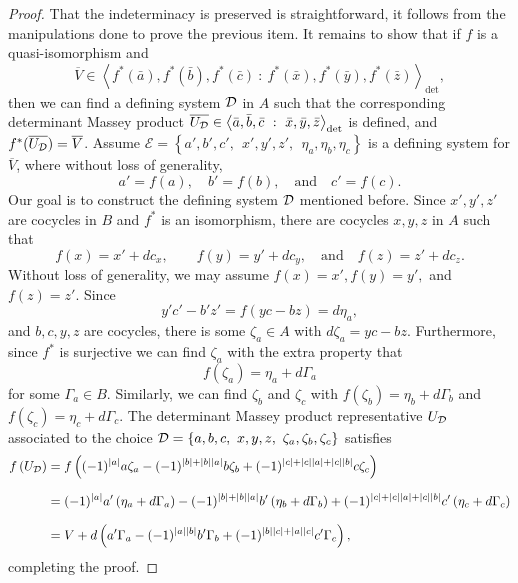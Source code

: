 \documentclass[11pt]{article}
\theoremstyle{definition}
\theoremstyle{definition}
\begin{document}
\begin{proof}
That the indeterminacy is preserved is straightforward, it follows from the manipulations done to prove the 
previous item.
It remains to show that if $f$ is a quasi-isomorphism and 
\begin{equation*}
\overline{V}\in \left\langle f^*(\bar a),f^*(\bar b),f^*(\bar c) \ : \ f^*(\bar x),f^*(\bar y), f^*(\bar z)\right\rangle_{\det},
\end{equation*}
then we can find a defining system $\mathcal D$ in $A$ such that the corresponding determinant
Massey product $\overline{U_\mathcal D} \in \left\langle \bar a, \bar b,\bar c \ : \ \bar x,\bar y, \bar z\right\rangle_{\det}$
is defined, and $f^*(\overline{U_\mathcal D}) = \overline{V}$.
Assume $\mathcal E = \left\{a',b',c', \ \ x',y',z', \ \ \eta_a,\eta_b,\eta_c\right\}$ is a defining system for $\overline{V}$,
where without loss of generality, 
\begin{equation*}
a' = f(a), \quad b'=f(b),\quad  \textrm{and}\quad c'=f(c).
\end{equation*}
Our goal is to construct the defining system $\mathcal D$ mentioned before.
Since $x',y',z'$ are cocycles in $B$ and $f^*$ is an isomorphism, there are cocycles $x,y,z$ in $A$ such that 
\begin{equation*}
f(x) = x' +dc_x,\qquad f(y) = y'+dc_y,\quad \textrm{and} \quad f(z)=z'+dc_z.
\end{equation*}
Without loss of generality, we may assume $f(x)=x', f(y)=y',$ and $f(z)=z'$.
Since 
\begin{equation*}
y'c'-b'z' = f\left(yc-bz\right) = d\eta_a,
\end{equation*}
and $b,c,y,z$ are cocycles, there is some $\zeta_a\in A$ with $d\zeta_a = yc-bz$.
Furthermore, since $f^*$ is surjective we can find $\zeta_a$ with the extra property that
\begin{equation*}
f\left(\zeta_a\right) = \eta_a + d\Gamma_a
\end{equation*}
for some $\Gamma_a\in B$.
Similarly, we can find $\zeta_b$ and $\zeta_c$ with $f\left(\zeta_b\right) = \eta_b + d\Gamma_b$ and 
$f\left(\zeta_c\right) = \eta_c + d\Gamma_c$.
The determinant Massey product representative $U_\mathcal D$
associated to the choice $\mD = \left\{a,b,c,\ x,y,z,\ \zeta_a,\zeta_b,\zeta_c \right\}$
satisfies
\begin{align*}
f\left(U_\mathcal D\right) 
& = f\left((-1)^{|a|}a\zeta_a - (-1)^{|b| + |b||a|}b \zeta_b + (-1)^{|c|+ |c||a| + |c||b| }c\zeta_c\right)\\[0.25cm]
&= (-1)^{|a|}a'\left(\eta_a + d\Gamma_a\right) - (-1)^{|b| + |b||a|}b' \left(\eta_b + d\Gamma_b\right) 
+ (-1)^{|c|+ |c||a| + |c||b| }c'\left(\eta_c + d\Gamma_c\right)  \\[0.25cm]
&= V + d\left(a'\Gamma_a - (-1)^{|a||b|}b'\Gamma_b 
+ (-1)^{|b||c| + |a||c| }c'\Gamma_c\right),
\end{align*}
completing the proof.
\end{proof}
\end{document}
